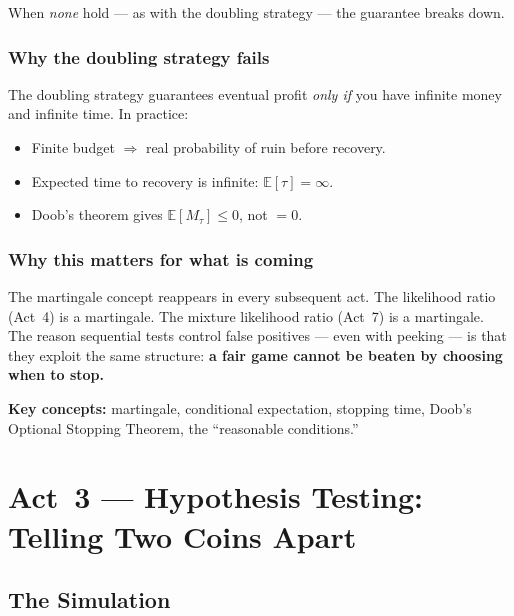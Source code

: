\documentclass[12pt, a4paper]{article}
\newcommand{\E}{\mathbb{E}}            %
\begin{document}
When \emph{none} hold --- as with the doubling strategy --- the guarantee
breaks down.

\subsubsection*{Why the doubling strategy fails}

The doubling strategy guarantees eventual profit \emph{only if} you have
infinite money and infinite time.  In practice:
\begin{itemize}[nosep]
  \item Finite budget $\Rightarrow$ real probability of ruin before recovery.
  \item Expected time to recovery is infinite: $\E[\tau] = \infty$.
  \item Doob's theorem gives $\E[M_\tau] \leq 0$, not $= 0$.
\end{itemize}

\subsubsection*{Why this matters for what is coming}

The martingale concept reappears in every subsequent act.  The likelihood
ratio (Act~4) is a martingale.  The mixture likelihood ratio (Act~7) is a
martingale.  The reason sequential tests control false positives --- even
with peeking --- is that they exploit the same structure: \textbf{a fair game
cannot be beaten by choosing when to stop.}

\begin{keytakeaway}
\textbf{Key concepts:} martingale, conditional expectation, stopping time,
Doob's Optional Stopping Theorem, the ``reasonable conditions.''
\end{keytakeaway}


\newpage
\section{Act~3 --- Hypothesis Testing: Telling Two Coins Apart}

\subsection{The Simulation}
\end{document}

